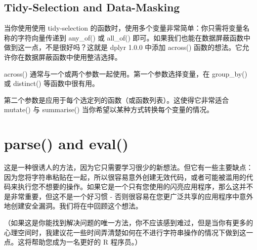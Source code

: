 \subsection{Tidy-Selection and Data-Masking}
当你使用使用 tidy-selection 的函数时，使用多个变量非常简单：你只需将变量名称的字符向量传递到 any\_of() 或 all\_of() 即可。如果我们也能在数据屏蔽函数中做到这一点，不是很好吗？这就是 dplyr 1.0.0 中添加 across() 函数的想法。它允许你在数据屏蔽函数中使用整洁选择。

across() 通常与一个或两个参数一起使用。第一个参数选择变量，在 group\_by() 或 distinct() 等函数中很有用。

第二个参数是应用于每个选定列的函数（或函数列表）。这使得它非常适合 mutate() 与 summarise() 当你希望以某种方式转换每个变量的情况。
\section{parse() and eval()}
这是一种很诱人的方法，因为它只需要学习很少的新想法。但它有一些主要缺点：因为您将字符串粘贴在一起，所以很容易意外创建无效代码，或者可能被滥用的代码来执行您不想要的操作。如果它是一个只有您使用的闪亮应用程序，那么这并不是非常重要，但这不是一个好习惯 - 否则很容易在您更广泛共享的应用程序中意外地创建安全漏洞。我们将在中回顾这个想法。

（如果这是你能找到解决问题的唯一方法，你不应该感到难过，但是当你有更多的心理空间时，我建议花一些时间弄清楚如何在不进行字符串操作的情况下做到这一点。这将帮助您成为一名更好的 R 程序员。）